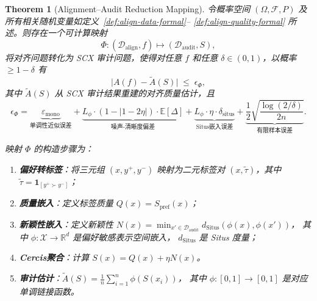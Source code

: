 \documentclass[12pt,a4paper]{article}
\newtheorem{theorem}{Theorem}[section]
\newcommand{\R}{\mathbb{R}}
\newcommand{\E}{\mathbb{E}}
\newcommand{\cX}{\mathcal{X}}
\newcommand{\cD}{\mathcal{D}}
\newcommand{\ind}[1]{\mathbf{1}_{[#1]}}
\newcommand{\Situs}{\mathrm{Situs}}
\begin{document}
\begin{theorem}[Alignment--Audit Reduction Mapping]
\label{thm:reduction}
令概率空间 $(\Omega,\mathcal{F},P)$ 及所有相关随机变量如定义~\ref{def:align-data-formal}--
\ref{def:align-quality-formal} 所述。则存在一个可计算映射
\[
\Phi: (\cD_{\mathrm{align}}, f) \longmapsto (\cD_{\mathrm{audit}}, S),
\]
将对齐问题转化为 SCX 审计问题，使得对任意 $f$ 和任意 $\delta\in(0,1)$，以概率 $\geq 1-\delta$ 有
\[
\bigl| A(f) - \tilde{A}(S) \bigr| \;\leq\; \epsilon_\Phi,
\]
其中 $\tilde{A}(S)$ 从 SCX 审计结果重建的对齐质量估计，且
\[
\epsilon_\Phi = \underbrace{\varepsilon_{\mathrm{mono}}}_{\text{单调性近似误差}}
               + \underbrace{L_\phi \cdot (1-|1-2\eta|) \cdot \E[\Delta]}_{\text{噪声-清晰度偏差}}
               + \underbrace{L_\phi \cdot \eta \cdot \delta_{\mathrm{situs}}}_{\text{Situs嵌入误差}}
               + \underbrace{\frac{1}{2}\sqrt{\frac{\log(2/\delta)}{2n}}}_{\text{有限样本误差}}.
\]

映射 $\Phi$ 的构造步骤为：
\begin{enumerate}[label=(\roman*)]
    \item \textbf{偏好转标签}：将三元组 $(x,y^+,y^-)$ 映射为二元标签对
          $(x, \tilde{\tau})$，其中 $\tilde{\tau} = \ind{y^+ \succ y^-}$；
    \item \textbf{质量嵌入}：定义标签质量 $Q(x) = S_{\mathrm{pref}}(x)$；
    \item \textbf{新颖性嵌入}：定义新颖性
          $N(x) = \min_{x'\in\cD_{\mathrm{audit}}} d_{\Situs}(\phi(x),\phi(x'))$，
          其中 $\phi:\cX\to\R^d$ 是偏好敏感表示空间嵌入，
          $d_{\Situs}$ 是 Situs 度量；
    \item \textbf{Cercis聚合}：计算 $S(x) = Q(x) + \eta N(x)$。
    \item \textbf{审计估计}：$\tilde{A}(S) = \frac{1}{n}\sum_{i=1}^n \phi(S(x_i))$，
          其中 $\phi:[0,1]\to[0,1]$ 是对应单调链接函数。
\end{enumerate}
\end{theorem}
\end{document}
